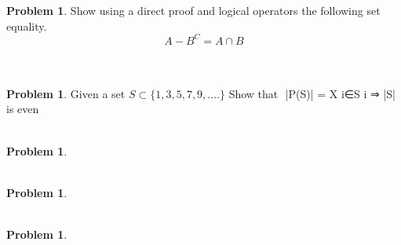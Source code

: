 \documentclass[10pt,leqno ]{article}
\theoremstyle{definition}
\newtheorem{problem}[theorem]{Problem}
\begin{document}
\begin{problem} Show using a direct proof and logical operators the following set equality.
$$A − B^C = A ∩ B$$
\\\\
\Large

\end{problem}
\newpage


\begin{problem} Given a set $S \subset \{1, 3, 5, 7, 9, .\dots \}$ Show that
$$ |P(S)| = X i∈S i ⇒ |S| is even
\\\\
\Large

\end{problem}
\newpage


\begin{problem} 
\\\\
\Large

\end{problem}
\newpage


\begin{problem} 
\\\\
\Large

\end{problem}
\newpage


\begin{problem} 
\\\\
\Large

\end{problem}
\newpage
\end{document}
